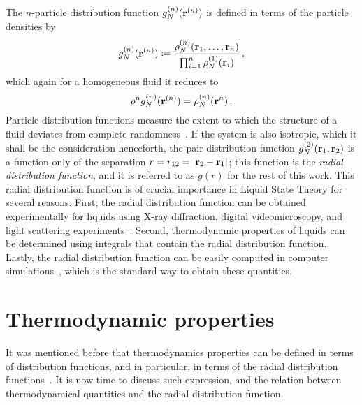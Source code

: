 The $n$-particle distribution function $g^{(n)}_{N} (\mathbf{r}^{(n)})$ is defined in terms
of the particle densities by
\begin{equation}
    g^{(n)}_{N} (\mathbf{r}^{(n)}) \coloneqq \frac{\rho^{(n)}_{N} (\mathbf{r}_{1}, \dots , \mathbf{r}_{n})}
    {\prod_{i=1}^{n} \rho^{(1)}_{N} (\mathbf{r}_{i})} \, ,
    \label{eq:gr-def}
\end{equation}
which again for a homogeneous fluid it reduces to
\begin{equation}
    \rho^{n} g^{(n)}_{N} (\mathbf{r}^{(n)}) = \rho^{(n)}_{N} (\mathbf{r}^{n}) \, .
    \label{eq:homogenous-gr}
\end{equation}
Particle distribution functions measure the extent to which the structure of a fluid 
deviates from complete randomness~\cite{hansenTheorySimpleLiquids2013}.
If the system is also isotropic, which it shall be the consideration henceforth,
the pair distribution function $g^{(2)}_{N} (\mathbf{r}_{1}, \mathbf{r}_{2})$ is a function only
of the separation $r = r_{12} = \lvert \mathbf{r}_{2} - \mathbf{r}_{1} \rvert$;
this function is the \emph{radial distribution function}, and it is referred
to as $g(r)$ for the rest of this work.
This radial distribution function is of crucial importance in Liquid State Theory for
several reasons. First, the radial distribution function can be obtained experimentally
for liquids using X-ray diffraction, digital videomicroscopy, and light scattering
experiments~\cite{mcquarrieStatisticalMechanics2000}.
Second, thermodynamic properties of liquids can be determined using integrals that
contain the radial distribution function. Lastly, the radial distribution function can
be easily computed in computer simulations~\cite{allenComputerSimulationLiquids2017}, 
which is the standard way to obtain these quantities.

\section{Thermodynamic properties}

It was mentioned before that thermodynamics properties can be defined in terms of
distribution functions, and in particular, in terms of the radial distribution
functions~\cite{hansenTheorySimpleLiquids2013}.
It is now time to discuss such expression, and the relation between thermodynamical
quantities and the radial distribution function.

